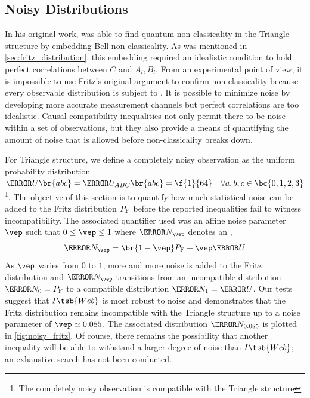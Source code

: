 \documentclass[aps, 10pt, english, twoside, pra, nofootinbib, tightenlines, longbibliography, superscriptaddress]{revtex4-1}
\begin{document}
    \subsection{Noisy Distributions}
    \label{sec:noise}
    In his original work, \citet{Fritz_2012} was able to find quantum non-classicality in the Triangle structure by embedding Bell non-classicality. As was mentioned in \cref{sec:fritz_distribution}, this embedding required an idealistic condition to hold: perfect correlations between $C$ and $A_l, B_l$. From an experimental point of view, it is impossible to use Fritz's original argument to confirm non-classicality because every observable distribution is subject to . It is possible to minimize noise by developing more accurate measurement channels but perfect correlations are too idealistic. Causal compatibility inequalities not only permit there to be noise within a set of observations, but they also provide a means of quantifying the amount of noise that is allowed before non-classicality breaks down.

    For Triangle structure, we define a completely noisy observation as the uniform probability distribution $\s{U}\br{abc} = \s{U}_{ABC}\br{abc} = \f{1}{64} \quad \forall a,b,c\in \bc{0,1,2,3}$\footnote{The completely noisy observation is compatible with the Triangle structure}. The objective of this section is to quantify how much statistical noise can be added to the Fritz distribution $\prob[\fritz]$ before the reported inequalities fail to witness incompatibility. The associated quantifier used was an affine noise parameter $\vep$ such that $0 \leq \vep \leq 1$ where $\s{N}_{\vep}$ denotes an ,
    \[ \s{N}_{\vep} = \br{1 - \vep} \prob[\fritz] + \vep \s{U} \]
    As $\vep$ varies from $0$ to $1$, more and more noise is added to the Fritz distribution and $\s{N}_{\vep}$ transitions from an incompatible distribution $\s{N}_{0} = \prob[\fritz]$ to a compatible distribution $\s{N}_{1} = \s{U}$. Our tests suggest that $I\tsb{Web}$ is most robust to noise and demonstrates that the Fritz distribution remains incompatible with the Triangle structure up to a noise parameter of $\vep \simeq 0.085$. The associated distribution $\s N_{0.085}$ is plotted in \cref{fig:noisy_fritz}. Of course, there remains the possibility that another inequality will be able to withstand a larger degree of noise than $I\tsb{Web}$; an exhaustive search has not been conducted.
\end{document}

